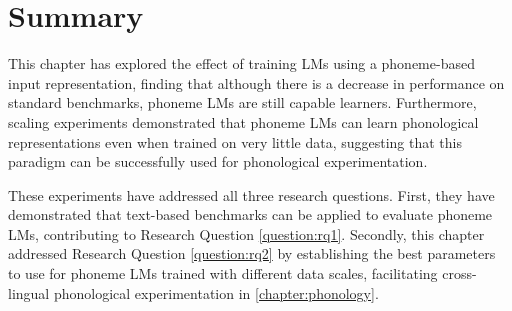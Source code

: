 


\section{Summary}

This chapter has explored the effect of training LMs using a phoneme-based input representation, finding that although there is a decrease in performance on standard benchmarks, phoneme LMs are still capable learners. Furthermore, scaling experiments demonstrated that phoneme LMs can learn phonological representations even when trained on very little data, suggesting that this paradigm can be successfully used for phonological experimentation. 

These experiments have addressed all three research questions. First, they have demonstrated that text-based benchmarks can be applied to evaluate phoneme LMs, contributing to Research Question \ref{question:rq1}. Secondly, this chapter addressed Research Question \ref{question:rq2} by establishing the best parameters to use for phoneme LMs trained with different data scales, facilitating cross-lingual phonological experimentation in  \cref{chapter:phonology}.


